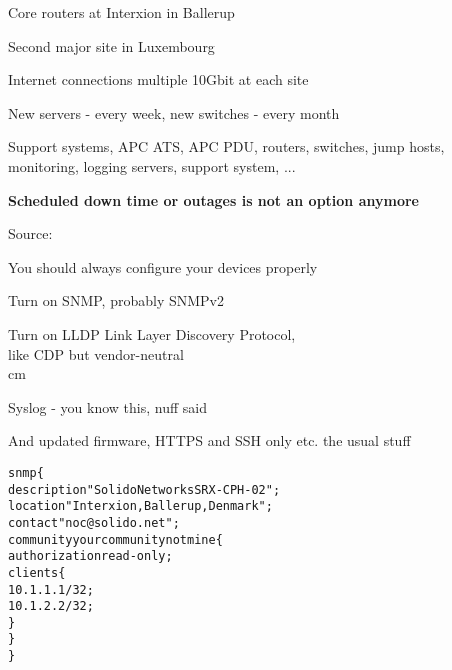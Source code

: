 \documentclass[28pt,landscape,a4paper,footrule]{foils}
\begin{document}
\begin{slidelist}
\item Core routers at Interxion in Ballerup
\item Second major site in Luxembourg
\item Internet connections multiple 10Gbit at each site
\item New servers - every week, new switches - every month
\item Support systems, APC ATS, APC PDU, routers, switches, jump hosts, monitoring, logging servers, support system, ...
\end{slidelist}
\vskip 1cm
\centerline{\bf Scheduled down time or outages is not an option anymore}



\centerline{Source: }




\begin{slidelist}
\item You should always configure your devices properly
\item Turn on SNMP, probably SNMPv2
\item Turn on LLDP Link Layer Discovery Protocol, \\
like CDP but vendor-neutral\\
{\small{}}
 cm
\item Syslog - you know this, nuff said
\item And updated firmware, HTTPS and SSH only etc. the usual stuff
\end{slidelist}



\begin{alltt}
snmp \{
    description "Solido Networks SRX-CPH-02";
    location "Interxion, Ballerup, Denmark";
    contact "noc@solido.net";
    community yourcommunitynotmine \{
        authorization read-only;
        clients \{
            10.1.1.1/32;
            10.1.2.2/32;
        \}
    \}
\}
\end{alltt}
\end{document}
